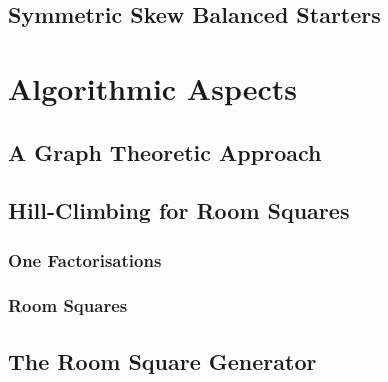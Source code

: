 \documentclass[a4paper, draft]{book}
\begin{document}
\chapter{Symmetric Skew Balanced Starters}
  \label{ch:symmetric-skew-balanced-starters}
  

\part{Algorithmic Aspects}

\chapter{A Graph Theoretic Approach}
  \label{ch:graph-theoretic}
  

\chapter{Hill-Climbing for Room Squares}
  \label{ch:hill-climbing}
  
  \section{One Factorisations}
  
  \section{Room Squares}
  

\appendix
\chapter{The Room Square Generator}
  \label{ch:room-square-generator}
  

\backmatter
\printbibliography[title=References]

\printindex
\end{document}
